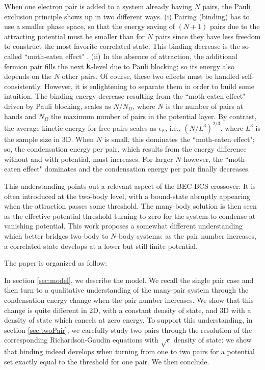\documentclass[5p,twocolumn]{elsarticle}
\begin{document}
When one electron pair is added to a system already having $N$ pairs, the Pauli exclusion principle shows up in two different ways.  (i) Pairing (binding) has to use a smaller phase space, so that the energy saving of $(N+1)$ pairs due to the attracting potential must be smaller than for $N$ pairs since they have less freedom to construct the most favorite correlated state.   This binding decrease is the so-called ``moth-eaten effect" \cite{moth}. (ii) In the absence of attraction, the additional fermion pair fills the next $\mathbf{k}$-level due to Pauli blocking; so its energy also depends on the $N$ other pairs.  Of course, these two effects must be handled self-consistently. However, it is enlightening to separate them in order to build some intuition. The binding energy decrease resulting from the ``moth-eaten effect" driven by Pauli blocking, scales as $N/N_\Omega$, where $N$ is the number of pairs at hands and $N_\Omega$ the maximum number of pairs in the potential layer. By contrast, the average kinetic energy for free pairs scales as $\epsilon_F$, i.e., $(N/L^3)^{2/3}$, where $L^{3}$ is the sample size in 3D. 
When $N$ is small, this dominates the ``moth-eaten effect"; so, the condensation energy per pair, which results from the energy difference without and with potential, must increases.  For larger $N$ however, the ``moth-eaten effect" dominates and the condensation energy per pair finally decreases.

This understanding points out a relevant aspect of the BEC-BCS crossover:  It is often introduced at the two-body level, with a bound-state abruptly appearing when the attraction passes some threshold. The many-body solution is then seen as the effective potential threshold turning to zero for the system to condense at vanishing potential. This work proposes a somewhat different understanding which better bridges two-body to $N$-body systems: as the pair number increases, a correlated state develops at a lower but still finite potential.

The paper is organized as follow:

In section \ref{sec:model}, we describe the model. We recall the single pair case and then turn to a qualitative understanding of the many-pair system through the condensation energy change when the pair number increases. We show that this change is quite different in 2D, with a constant density of state, and 3D  with a density of state which cancels at zero energy.  To support this understanding, in section \ref{sec:twoPair}, we carefully study two pairs through the resolution of the corresponding  Richardson-Gaudin equations with  $\sqrt{\epsilon}$ density of state: we show that  binding indeed develops when turning from one to two pairs for a potential set exactly equal to the threshold for one pair. We then conclude.
\end{document}
